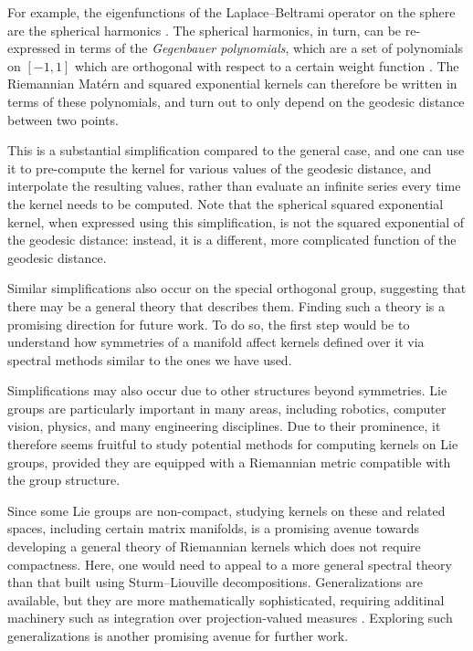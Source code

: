 \documentclass[11pt]{book}
\begin{document}
For example, the eigenfunctions of the Laplace--Beltrami operator on the sphere are the spherical harmonics \cite{chavel84,canzani13}.
The spherical harmonics, in turn, can be re-expressed in terms of the \emph{Gegenbauer polynomials}, which are a set of polynomials on $[-1,1]$ which are orthogonal with respect to a certain weight function \cite{gradshteyn14}.
The Riemannian Matérn and squared exponential kernels can therefore be written in terms of these polynomials, and turn out to only depend on the geodesic distance between two points.

This is a substantial simplification compared to the general case, and one can use it to pre-compute the kernel for various values of the geodesic distance, and interpolate the resulting values, rather than evaluate an infinite series every time the kernel needs to be computed.
Note that the spherical squared exponential kernel, when expressed using this simplification, is not the squared exponential of the geodesic distance: instead, it is a different, more complicated function of the geodesic distance.

Similar simplifications also occur on the special orthogonal group, suggesting that there may be a general theory that describes them.
Finding such a theory is a promising direction for future work.
To do so, the first step would be to understand how symmetries of a manifold affect kernels defined over it via spectral methods similar to the ones we have used.

Simplifications may also occur due to other structures beyond symmetries.
Lie groups are particularly important in many areas, including robotics, computer vision, physics, and many engineering disciplines.
Due to their prominence, it therefore seems fruitful to study potential methods for computing kernels on Lie groups, provided they are equipped with a Riemannian metric compatible with the group structure.

Since some Lie groups are non-compact, studying kernels on these and related spaces, including certain matrix manifolds, is a promising avenue towards developing a general theory of Riemannian kernels which does not require compactness.
Here, one would need to appeal to a more general spectral theory than that built using Sturm--Liouville decompositions.
Generalizations are available, but they are more mathematically sophisticated, requiring additinal machinery such as integration over projection-valued measures \cite{lang12}.
Exploring such generalizations is another promising avenue for further work.
\end{document}
